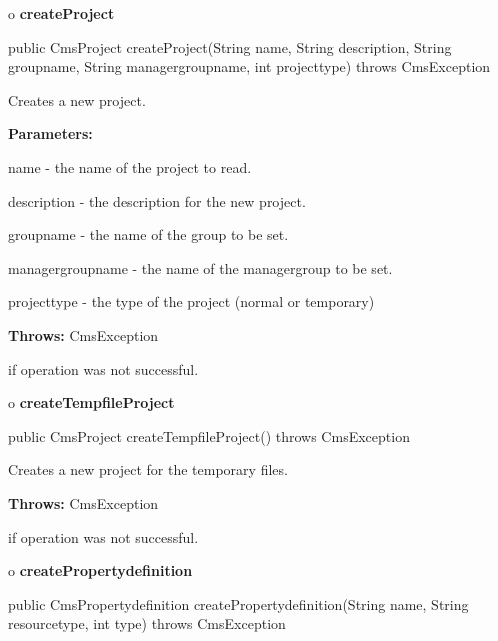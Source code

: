 o {\bf createProject} 

\begin{PRE}
 public CmsProject createProject(String name,
                                 String description,
                                 String groupname,
                                 String managergroupname,
                                 int projecttype) throws CmsException
\end{PRE}

\begin{description}
\htmlDD Creates a new project. 

\begin{description}
\item {\bf Parameters:}  

name - the name of the project to read.  

description - the description for the new project.  

groupname - the name of the group to be set.  

managergroupname - the name of the managergroup to be set.  

projecttype - the type of the project (normal or temporary)  
\item {\bf Throws:} CmsException  

if operation was not successful.  
\end{description}

\end{description}

o {\bf createTempfileProject} 

\begin{PRE}
 public CmsProject createTempfileProject() throws CmsException
\end{PRE}

\begin{description}
\htmlDD Creates a new project for the temporary files. 

\begin{description}
\item {\bf Throws:} CmsException  

if operation was not successful.  
\end{description}

\end{description}

o {\bf createPropertydefinition} 

\begin{PRE}
 public CmsPropertydefinition createPropertydefinition(String name,
                                                       String resourcetype,
                                                       int type) throws CmsException
\end{PRE}

